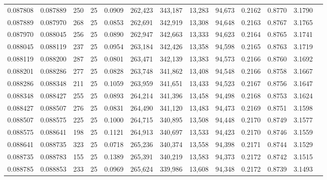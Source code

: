 \begin{tabular}{rrrrrrrrrrrrr}
0.087808 & 0.087889 &   250 &  25 &                                     0.0909 & 262,423 & 343,187 &  13,283 &  94,673 & 0.2162 & 0.8770 & 3.1790 \\
0.087889 & 0.087970 &   268 &  25 &                                     0.0853 & 262,691 & 342,919 &  13,308 &  94,648 & 0.2163 & 0.8767 & 3.1765 \\
0.087970 & 0.088045 &   256 &  25 &                                     0.0890 & 262,947 & 342,663 &  13,333 &  94,623 & 0.2164 & 0.8765 & 3.1741 \\
0.088045 & 0.088119 &   237 &  25 &                                     0.0954 & 263,184 & 342,426 &  13,358 &  94,598 & 0.2165 & 0.8763 & 3.1719 \\
0.088119 & 0.088200 &   287 &  25 &                                     0.0801 & 263,471 & 342,139 &  13,383 &  94,573 & 0.2166 & 0.8760 & 3.1692 \\
0.088201 & 0.088286 &   277 &  25 &                                     0.0828 & 263,748 & 341,862 &  13,408 &  94,548 & 0.2166 & 0.8758 & 3.1667 \\
0.088286 & 0.088348 &   211 &  25 &                                     0.1059 & 263,959 & 341,651 &  13,433 &  94,523 & 0.2167 & 0.8756 & 3.1647 \\
0.088348 & 0.088427 &   255 &  25 &                                     0.0893 & 264,214 & 341,396 &  13,458 &  94,498 & 0.2168 & 0.8753 & 3.1624 \\
0.088427 & 0.088507 &   276 &  25 &                                     0.0831 & 264,490 & 341,120 &  13,483 &  94,473 & 0.2169 & 0.8751 & 3.1598 \\
0.088507 & 0.088575 &   225 &  25 &                                     0.1000 & 264,715 & 340,895 &  13,508 &  94,448 & 0.2170 & 0.8749 & 3.1577 \\
0.088575 & 0.088641 &   198 &  25 &                                     0.1121 & 264,913 & 340,697 &  13,533 &  94,423 & 0.2170 & 0.8746 & 3.1559 \\
0.088641 & 0.088735 &   323 &  25 &                                     0.0718 & 265,236 & 340,374 &  13,558 &  94,398 & 0.2171 & 0.8744 & 3.1529 \\
0.088735 & 0.088783 &   155 &  25 &                                     0.1389 & 265,391 & 340,219 &  13,583 &  94,373 & 0.2172 & 0.8742 & 3.1515 \\
0.088785 & 0.088853 &   233 &  25 &                                     0.0969 & 265,624 & 339,986 &  13,608 &  94,348 & 0.2172 & 0.8739 & 3.1493 \\

\end{tabular}
